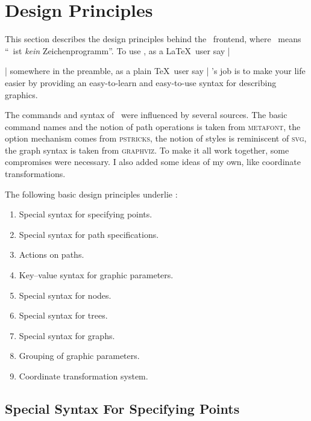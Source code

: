 %
%
%


\section{Design Principles}

This section describes the design principles behind the \tikzname\ frontend,
where \tikzname\ means ``\tikzname\ ist \emph{kein} Zeichenprogramm''. To use
\tikzname, as a \LaTeX\ user say |\usepackage{tikz}| somewhere in the preamble,
as a plain \TeX\ user say | \tikzname's job is to make your
life easier by providing an easy-to-learn and easy-to-use syntax for describing
graphics.

The commands and syntax of \tikzname\ were influenced by several sources. The
basic command names and the notion of path operations is taken from
\textsc{metafont}, the option mechanism comes from \textsc{pstricks}, the
notion of styles is reminiscent of \textsc{svg}, the graph syntax is taken from
\textsc{graphviz}. To make it all work together, some compromises were
necessary. I also added some ideas of my own, like coordinate transformations.

The following basic design principles underlie \tikzname:
%
\begin{enumerate}
    \item Special syntax for specifying points.
    \item Special syntax for path specifications.
    \item Actions on paths.
    \item Key--value syntax for graphic parameters.
    \item Special syntax for nodes.
    \item Special syntax for trees.
    \item Special syntax for graphs.
    \item Grouping of graphic parameters.
    \item Coordinate transformation system.
\end{enumerate}


\subsection{Special Syntax For Specifying Points}

